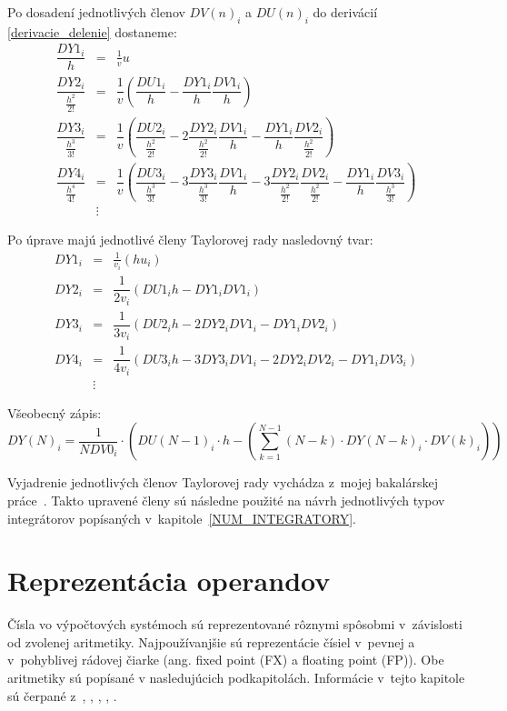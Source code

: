 Po dosadení jednotlivých členov $ DV(n)_{i} $ a $ DU(n)_{i} $ do derivácií \eqref{derivacie_delenie} dostaneme:
\begin{eqnarray}
\dfrac{DY1_{i}}{h} & = & \frac{1}{v} u~\\
\dfrac{DY2_{i}}{\frac{h^{2}}{2!}} & = & \dfrac{1}{v} ( \dfrac{DU1_{i}}{h} - \dfrac{DY1_{i}}{h}\dfrac{DV1_{i}}{h} ) \nonumber \\
\dfrac{DY3_{i}}{\frac{h^{3}}{3!}} & = & \dfrac{1}{v} 
( \dfrac{DU2_{i}}{\frac{h^{2}}{2!}} - 
2\dfrac{DY2_{i}}{\frac{h^{2}}{2!}} \dfrac{DV1_{i}}{h} - 
\dfrac{DY1_{i}}{h} \dfrac{DV2_{i}}{\frac{h^{2}}{2!}} ) \nonumber \\
\dfrac{DY4_{i}}{\frac{h^{4}}{4!}} & = & \dfrac{1}{v} 
( \dfrac{DU3_{i}}{\frac{h^{3}}{3!}} - 
3\dfrac{DY3_{i}}{\frac{h^{3}}{3!}} \dfrac{DV1_{i}}{h} - 
3\dfrac{DY2_{i}}{\frac{h^{2}}{2!}} \dfrac{DV2_{i}}{\frac{h^{2}}{2!}} -
\dfrac{DY1_{i}}{h} \dfrac{DV3_{i}}{\frac{h^{3}}{3!}} ) \nonumber \\
& \vdots \nonumber & 
\end{eqnarray}


Po úprave majú jednotlivé členy Taylorovej rady nasledovný tvar:
\begin{eqnarray}
DY1_{i} & = & \frac{1}{v_{i}} (hu_{i}) \label{DY1_cleny_delenia} \\
DY2_{i} & = & \dfrac{1}{2v_{i}} (DU1_{i}h - DY1_{i}DV1_{i}) \label{DY2_cleny_delenia} \\
DY3_{i} & = & \dfrac{1}{3v_{i}} ( DU2_{i}h - 2DY2_{i}DV1_{i} - DY1_{i}DV2_{i} ) \label{DY3_cleny_delenia} \\
DY4_{i} & = & \dfrac{1}{4v_{i}} ( DU3_{i}h - 3DY3_{i}DV1_{i} - 2DY2_{i}DV2_{i} - DY1_{i}DV3_{i} ) \label{DY4_cleny_delenia} \\ 
& \vdots \nonumber & 
\end{eqnarray}

Všeobecný zápis:
\begin{equation}
DY(N)_{i} = \dfrac{1}{N DV0_{i}} \cdot \left( DU(N-1)_{i} \cdot h - \left( \sum_{k=1}^{N-1} (N-k) \cdot DY(N-k)_{i} \cdot DV(k)_{i} \right) \right) \nonumber
\end{equation}
\bigskip

Vyjadrenie jednotlivých členov Taylorovej rady vychádza z~mojej bakalárskej práce~\cite{MatecnyBP}. Takto upravené členy sú následne použité na návrh jednotlivých typov integrátorov popísaných v~kapitole~\ref{NUM_INTEGRATORY}.



\chapter{Reprezentácia operandov} \label{REPREZENTACIA_OPERANDOV}
Čísla vo výpočtových systémoch sú reprezentované rôznymi spôsobmi v~závislosti od zvolenej aritmetiky. Najpoužívanjšie sú reprezentácie čísiel v~pevnej a v~pohyblivej rádovej čiarke (ang. fixed point (FX) a floating point (FP)). Obe aritmetiky sú popísané v nasledujúcich podkapitolách. Informácie v~tejto kapitole sú čerpané z~\cite{FXOnline}, \cite{FPOnline}, \cite{KrausDisP}, \cite{inpFP}, \cite{inpRepDat}.


